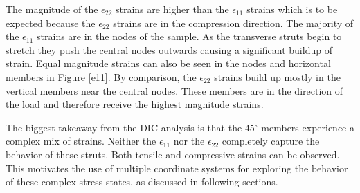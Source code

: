 The magnitude of the $\epsilon_{22}$ strains are higher than the $\epsilon_{11}$ strains which is to be expected because the $\epsilon_{22}$ strains are in the compression direction. The majority of the $\epsilon_{11}$ strains are in the nodes of the sample. As the transverse struts begin to stretch they push the central nodes outwards causing a significant buildup of strain. Equal magnitude strains can also be seen in the nodes and horizontal members in Figure \ref{e11}. By comparison, the $\epsilon_{22}$ strains build up mostly in the vertical members near the central nodes. These members are in the direction of the load and therefore receive the highest magnitude strains.

The biggest takeaway from the DIC analysis is that the 45$^\circ$ members experience a complex mix of strains. Neither the $\epsilon_{11}$ nor the $\epsilon_{22}$ completely capture the behavior of these struts. Both tensile and compressive strains can be observed. This motivates the use of multiple coordinate systems for exploring the behavior of these complex stress states, as discussed in following sections.